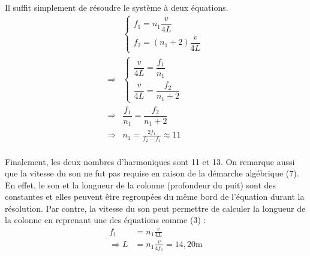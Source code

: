 \documentclass[11pt]{article}
\begin{document}
Il suffit simplement de résoudre le système à deux équations.
\begin{equation}
\begin{split}
&\begin{cases}
f_1=n_1\dfrac{v}{4L}\\f_2=(n_1+2)\dfrac{v}{4L}
\end{cases}\\
\Rightarrow
&\begin{cases}
\dfrac{v}{4L}=\dfrac{f_1}{n_1}\\\dfrac{v}{4L}=\dfrac{f_2}{n_1+2}
\end{cases}\\
\Rightarrow&\dfrac{f_1}{n_1}=\dfrac{f_2}{n_1+2}\\
\Rightarrow&n_1=\frac{2f_1}{f_2-f_1}\approx 11\\
\end{split}
\end{equation}

Finalement, les deux nombres d'harmoniques sont 11 et 13. On remarque aussi que la vitesse du son ne fut pas requise en raison de la démarche algébrique (7). En effet, le son et la longueur de la colonne (profondeur du puit) sont des constantes et elles peuvent être regroupées du même bord de l'équation durant la résolution. Par contre, la vitesse du son peut permettre de calculer la longueur de la colonne en reprenant une des équations comme (3) :
\begin{equation}
\begin{split}
f_1&=n_1\frac{v}{4L}\\
\Rightarrow L&=n_1\frac{v}{4f_1}=14,20\mathrm{m}\\
\end{split}
\end{equation}
\end{document}
